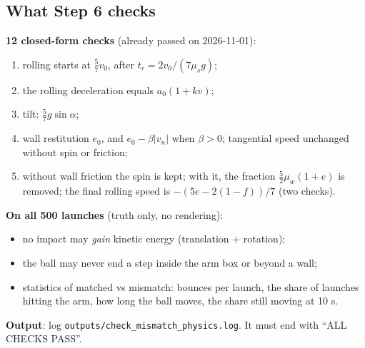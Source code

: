\documentclass[11pt,a4paper]{article}
\begin{document}
\subsection{What Step 6 checks}
\textbf{12 closed-form checks} (already passed on 2026-11-01):
\begin{enumerate}
\item rolling starts at $\frac57 v_0$, after $t_r=2v_0/(7\mu_s g)$;
\item the rolling deceleration equals $a_0(1+kv)$;
\item tilt: $\frac57 g\sin\alpha$;
\item wall restitution $e_0$, and $e_0-\beta|v_n|$ when $\beta>0$; tangential speed unchanged without spin or friction;
\item without wall friction the spin is kept; with it, the fraction $\frac52\mu_w(1+e)$ is removed; the final rolling speed
  is $-(5e-2(1-f))/7$ (two checks).
\end{enumerate}
\textbf{On all 500 launches} (truth only, no rendering):
\begin{itemize}
\item no impact may \emph{gain} kinetic energy (translation + rotation);
\item the ball may never end a step inside the arm box or beyond a wall;
\item statistics of matched vs mismatch: bounces per launch, the share of launches hitting the arm, how long the ball
  moves, the share still moving at 10 s.
\end{itemize}
\textbf{Output}: log \texttt{outputs/check\_mismatch\_physics.log}. It must end with ``ALL CHECKS PASS''.

\end{document}

